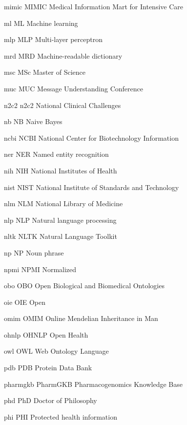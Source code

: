 \newabbreviation
{mimic}
{MIMIC}
{Medical Information Mart for Intensive Care}

\newabbreviation
{ml}
{ML}
{Machine learning}

\newabbreviation
{mlp}
{MLP}
{Multi-layer perceptron}

\newabbreviation
{mrd}
{MRD}
{Machine-readable dictionary}

\newabbreviation
{msc}
{MSc}
{Master of Science}

\newabbreviation
{muc}
{MUC}
{Message Understanding Conference}

\newabbreviation
{n2c2}
{n2c2}
{National  Clinical Challenges}

\newabbreviation
{nb}
{NB}
{Naive Bayes}

\newabbreviation
{ncbi}
{NCBI}
{National Center for Biotechnology Information}

\newabbreviation
{ner}
{NER}
{Named entity recognition}

\newabbreviation
{nih}
{NIH}
{National Institutes of Health}

\newabbreviation
{nist}
{NIST}
{National Institute of Standards and Technology}

\newabbreviation
{nlm}
{NLM}
{National Library of Medicine}

\newabbreviation
{nlp}
{NLP}
{Natural language processing}

\newabbreviation
{nltk}
{NLTK}
{Natural Language Toolkit}

\newabbreviation
{np}
{NP}
{Noun phrase}

\newabbreviation
{npmi}
{NPMI}
{Normalized }

\newabbreviation
{obo}
{OBO}
{Open Biological and Biomedical Ontologies}

\newabbreviation
{oie}
{OIE}
{Open }

\newabbreviation
{omim}
{OMIM}
{Online Mendelian Inheritance in Man}

\newabbreviation
{ohnlp}
{OHNLP}
{Open Health }

\newabbreviation
{owl}
{OWL}
{Web Ontology Language}

\newabbreviation
{pdb}
{PDB}
{Protein Data Bank}

\newabbreviation
{pharmgkb}
{PharmGKB}
{Pharmacogenomics Knowledge Base}

\newabbreviation
{phd}
{PhD}
{Doctor of Philosophy}

\newabbreviation
{phi}
{PHI}
{Protected health information}

